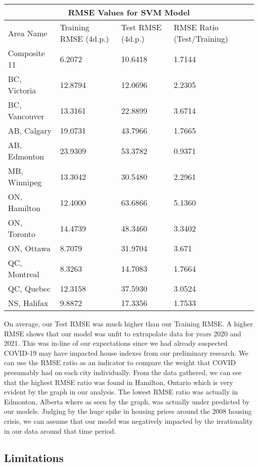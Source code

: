 \documentclass{article}
\begin{document}
\begin{center}
\begin{tabular}{ |p{3cm}||p{3cm}|p{3cm}|p{3cm}| }
 \hline
 \multicolumn{4}{|c|}{RMSE Values for SVM Model} \\
 \hline
 Area Name& Training RMSE (4d.p.) & Test RMSE (4d.p.) & RMSE Ratio (Test/Training)\\
 \hline
 Composite 11 & 6.2072 & 10.6418 & 1.7144\\
 BC, Victoria & 12.8794  & 12.0696 & 2.2305\\
 BC, Vancouver & 13.3161 & 22.8899 & 3.6714\\
 AB, Calgary & 19.0731 & 43.7966 & 1.7665\\
 AB, Edmonton & 23.9309 & 53.3782 & 0.9371\\
 MB, Winnipeg & 13.3042  & 30.5480 & 2.2961\\
 ON, Hamilton & 12.4000  & 63.6866 & 5.1360\\
 ON, Toronto & 14.4739  & 48.3460 & 3.3402\\
 ON, Ottawa & 8.7079  & 31.9704 & 3.671\\
 QC, Montreal & 8.3263  & 14.7083 & 1.7664\\
 QC, Quebec & 12.3158  & 37.5930 & 3.0524\\
 NS, Halifax & 9.8872  & 17.3356 & 1.7533\\
 \hline
\end{tabular}
\end{center}

On average, our Test RMSE was much higher than our Training RMSE. A higher RMSE shows that our model was unfit to extrapolate data for years 2020 and 2021. This was in-line of our expectations since we had already suspected COVID-19 may have impacted house indexes from our preliminary research. We can use the RMSE ratio as an indicator to compare the weight that COVID presumably had on each city individually. From the data gathered, we can see that the highest RMSE ratio was found in Hamilton, Ontario which is very evident by the graph in our analysis. The lowest RMSE ratio was actually in Edmonton, Alberta where as seen by the graph, was actually under predicted by our models. Judging by the huge spike in housing prices around the 2008 housing crisis, we can assume that our model was negatively impacted by the irrationality in our data around that time period.

\subsection{Limitations}
\end{document}
